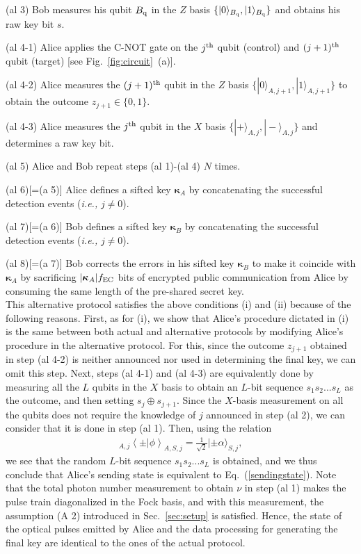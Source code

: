 \documentclass[prl,twocolumn,superscriptaddress,nofootinbib]{revtex4}
\def\U#1{{\rm #1}}
\newcommand{\ket}[1]{| #1 \rangle}
\newcommand{\expect}[1]{\left\langle #1 \right\rangle}
\begin{document}
  (al 3) Bob measures his qubit $B_{\U{q}}$ in the $Z$ basis $\{\ket{0}_{B_{\U{q}}},\ket{1}_{B_{\U{q}}}\}$ and obtains his raw key bit $s$.

  (al 4-1) Alice applies the C-NOT gate on the $j^{\U{th}}$ qubit (control) and $(j+1)^{\U{th}}$ qubit (target)
  [see Fig.~\ref{fig:circuit}~(a)]. 

  (al 4-2) Alice measures the  $(j+1)^{\U{th}}$ qubit in the $Z$ basis $\{\ket{0}_{A,j+1},\ket{1}_{A,j+1}\}$ to obtain the outcome
  $z_{j+1}\in\{0,1\}$. 

  (al 4-3) Alice measures the $j^{\U{th}}$ qubit in the $X$ basis $\{\ket{+}_{A,j},\ket{-}_{A,j}\}$ and determines a raw key bit. 

  (al 5) Alice and Bob repeat steps (al 1)-(al 4) $N$ times. 
  
  (al 6)[=(a 5)] Alice defines a sifted key $\bm{\kappa}_A$ by concatenating the successful detection events ({\it i.e.,} $j\neq0$).

  (al 7)[=(a 6)] Bob defines a sifted key $\bm{\kappa}_B$ by concatenating the successful detection events ({\it i.e.,} $j\neq0$). 

  (al 8)[=(a 7)] Bob corrects the errors in his sifted key $\bm{\kappa}_B$ to make it coincide with $\bm{\kappa}_A$ by sacrificing
  $|\bm{\kappa}_A|f_{\U{EC}}$ bits of encrypted public communication from Alice by consuming the same length of the 
  pre-shared secret key.
\\

    This alternative protocol satisfies the above conditions (i) and (ii) because of the following reasons.
  First, as for (i), we show that Alice's procedure dictated in (i) is the same between both actual and alternative 
  protocols by modifying Alice's procedure in the alternative protocol. 
For this, since the outcome $z_{j+1}$ obtained in step (al 4-2) is neither announced nor used in determining the final key, we can 
omit this step. 
  Next, steps (al 4-1) and (al 4-3) are equivalently done by measuring all the $L$ qubits in the $X$ basis to obtain an 
  $L$-bit sequence $s_1s_2...s_L$ as the outcome, and then setting $s_{j}\oplus s_{j+1}$.
  Since the $X$-basis measurement on all the qubits does not require the knowledge of $j$ announced in step (al 2),
  we can consider that it is done in step (al 1).
  Then, using the relation
\begin{align}
{}_{A,j}\expect{\pm|\phi}_{A,S,j}=\frac{1}{\sqrt{2}}\ket{\pm\alpha}_{S,j},
\end{align}
we see that the random $L$-bit sequence $s_1s_2...s_L$ is obtained,
and we thus conclude that Alice's sending state is equivalent to Eq.~(\ref{sendingstate}). 
Note that
the total photon number measurement to obtain $\nu$ in step (al 1) makes the pulse train diagonalized in the Fock basis,
and with this measurement, the assumption (A 2) introduced in Sec.~\ref{sec:setup} is satisfied. 
Hence, the state of the optical pulses emitted by Alice and the data processing for generating the final key are identical to the 
ones of the actual protocol. 
 
\end{document}

